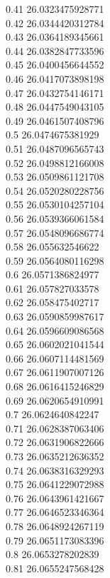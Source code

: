 {0.41	26.0323475928771\\
0.42	26.0344420312784\\
0.43	26.0364189345661\\
0.44	26.0382847733596\\
0.45	26.0400456644552\\
0.46	26.0417073898198\\
0.47	26.0432754146171\\
0.48	26.0447549043105\\
0.49	26.0461507408796\\
0.5	26.0474675381929\\
0.51	26.0487096565743\\
0.52	26.0498812166008\\
0.53	26.0509861121708\\
0.54	26.0520280228756\\
0.55	26.0530104257104\\
0.56	26.0539366061584\\
0.57	26.0548096686774\\
0.58	26.055632546622\\
0.59	26.0564080116298\\
0.6	26.0571386824977\\
0.61	26.057827033578\\
0.62	26.058475402717\\
0.63	26.0590859987617\\
0.64	26.0596609086568\\
0.65	26.0602021041544\\
0.66	26.0607114481569\\
0.67	26.0611907007126\\
0.68	26.0616415246829\\
0.69	26.0620654910991\\
0.7	26.0624640842247\\
0.71	26.0628387063406\\
0.72	26.0631906822666\\
0.73	26.0635212636352\\
0.74	26.0638316329293\\
0.75	26.0641229072988\\
0.76	26.0643961421667\\
0.77	26.0646523346364\\
0.78	26.0648924267119\\
0.79	26.0651173083396\\
0.8	26.0653278202839\\
0.81	26.0655247568428\\
}
